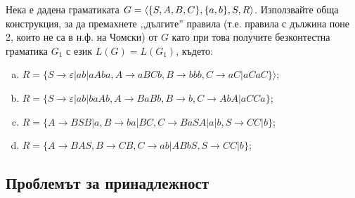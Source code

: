 \begin{problem}
  Нека е дадена граматиката  $G = \langle{\{S,A,B,C\}, \{a,b\}, S, R}\rangle$.
  Използвайте обща конструкция, за да премахнете ,,дългите'' правила 
  (т.е. правила с дължина поне 2, които не са в н.ф. на Чомски) от $ G$ като при това получите 
  безконтестна граматика $G_1$ с език $L(G)=L(G_1)$, където:
  \begin{enumerate}[a)]
  \item
    $R = \{S \rightarrow \varepsilon|ab|aAba, A\rightarrow aBCb, B\rightarrow bbb, C\rightarrow aC\vert aCaC\}\rangle$;
  \item
    $R = \{S \rightarrow \varepsilon|ab|baAb, A\rightarrow BaBb,B\rightarrow b,C\rightarrow AbA\vert aCCa\}$;
  \item
    $R = \{A\rightarrow BSB|a,B\rightarrow ba|BC,C\rightarrow BaSA|a|b,S\rightarrow CC|b\}$;
  \item
    $R = \{A\rightarrow BAS,B\rightarrow CB,C\rightarrow ab|ABbS,S\rightarrow CC|b\}$;
  \end{enumerate}
\end{problem}




\subsection{Проблемът за принадлежност}

